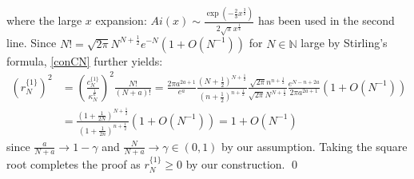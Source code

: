 \documentclass[11pt]{article}
\numberwithin{equation}{section}%
\numberwithin{theorem}{section}
\begin{document}
where the large $x$ expansion: $Ai(x)\sim\frac{\exp\left(-\frac{2}{3}x^\frac{3}{2}\right)}{2\sqrt\pi x^\frac{1}{4}}$ has been used in the second line. Since $N!=\sqrt{2\pi}N^{N+\frac{1}{2}}e^{-N}(1+O(N^{-1}))$ for $N\in\mathbb{N}$ large by Stirling's formula, \eqref{conCN} further yields:
\begin{equation}\label{ConRN}
\begin{split}
       \left(r^{\{1\}}_N\right)^2&=\left(\frac{c^{\{1\}}_N}{\kappa_N^\frac{1}{6}}\right)^2\frac{N!}{(N+a)!}=\frac{2\pi a^{2a+1}}{e^{a}}\frac{\left(N+\frac{1}{2}\right)^{N+\frac{1}{2}}}{\left(n+\frac{1}{2}\right)^{n+\frac{1}{2}}}\frac{\sqrt{2\pi}n^{n+\frac{1}{2}}}{\sqrt{2\pi}N^{N+\frac{1}{2}}}\frac{e^{N-n+2a}}{2\pi a^{2a+1}}\left(1+O(N^{-1})\right)\\
       &=\frac{\left(1+\frac{1}{2N}\right)^{N+\frac{1}{2}}}{\left(1+\frac{1}{2n}\right)^{n+\frac{1}{2}}}(1+O(N^{-1}))=1+O(N^{-1})
\end{split}
\end{equation}
since $\frac{a}{N+a}\rightarrow1-\gamma$ and $\frac{N}{N+a}\rightarrow\gamma\in(0,1)$ by our assumption. Taking the square root completes the proof as $r^{\{1\}}_N\ge0$ by our construction. \qed
\end{document}

